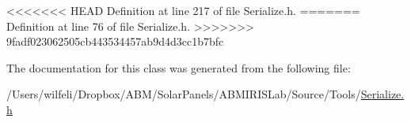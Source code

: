 <<<<<<< HEAD
Definition at line 217 of file Serialize.\+h.
=======
Definition at line 76 of file Serialize.\+h.
>>>>>>> 9fadf023062505cb443534457ab9d4d3cc1b7bfc



The documentation for this class was generated from the following file\+:\begin{DoxyCompactItemize}
\item 
/\+Users/wilfeli/\+Dropbox/\+A\+B\+M/\+Solar\+Panels/\+A\+B\+M\+I\+R\+I\+S\+Lab/\+Source/\+Tools/\hyperlink{_serialize_8h}{Serialize.\+h}\end{DoxyCompactItemize}
